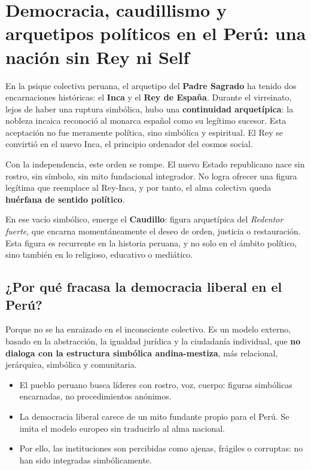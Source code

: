 	\section*{Democracia, caudillismo y arquetipos políticos en el Perú: una nación sin Rey ni Self}

En la psique colectiva peruana, el arquetipo del \textbf{Padre Sagrado} ha tenido dos encarnaciones históricas: el \textbf{Inca} y el \textbf{Rey de España}. Durante el virreinato, lejos de haber una ruptura simbólica, hubo una \textbf{continuidad arquetípica}: la nobleza incaica reconoció al monarca español como su legítimo sucesor. Esta aceptación no fue meramente política, sino simbólica y espiritual. El Rey se convirtió en el nuevo Inca, el principio ordenador del cosmos social.

Con la independencia, este orden se rompe. El nuevo Estado republicano nace sin rostro, sin símbolo, sin mito fundacional integrador. No logra ofrecer una figura legítima que reemplace al Rey-Inca, y por tanto, el alma colectiva queda \textbf{huérfana de sentido político}.

En ese vacío simbólico, emerge el \textbf{Caudillo}: figura arquetípica del \emph{Redentor fuerte}, que encarna momentáneamente el deseo de orden, justicia o restauración. Esta figura es recurrente en la historia peruana, y no solo en el ámbito político, sino también en lo religioso, educativo o mediático.

\subsection*{¿Por qué fracasa la democracia liberal en el Perú?}

Porque no se ha enraizado en el inconsciente colectivo. Es un modelo externo, basado en la abstracción, la igualdad jurídica y la ciudadanía individual, que \textbf{no dialoga con la estructura simbólica andina-mestiza}, más relacional, jerárquica, simbólica y comunitaria.

\begin{itemize}
	\item El pueblo peruano busca líderes con rostro, voz, cuerpo: figuras simbólicas encarnadas, no procedimientos anónimos.
	\item La democracia liberal carece de un mito fundante propio para el Perú. Se imita el modelo europeo sin traducirlo al alma nacional.
	\item Por ello, las instituciones son percibidas como ajenas, frágiles o corruptas: no han sido integradas simbólicamente.
\end{itemize}

